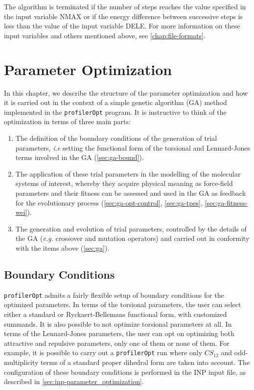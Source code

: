\documentclass[10pt,a4paper]{report}
\numberwithin{equation}{section}
\newcommand{\profileropt}[0]{\texttt{profilerOpt}}
\begin{document}
The algorithm is terminated if the number of steps reaches the value specified in the input variable NMAX or if the energy difference between successive steps is less than the value of the input variable DELE.
For more information on these input variables and others mentioned above, see \autoref{chap:file-formats}.

\chapter{Parameter Optimization}
\label{chap:ga}

In this chapter, we describe the structure of the parameter
optimization and how it is carried out in the context of a simple
genetic algorithm (GA) method implemented in the \profileropt{}
program. It is instructive to think of the optimization in terms of
three main parts:
\begin{enumerate}
\item The definition of the boundary conditions of the generation of
  trial parameters, \textit{i.e} setting the functional form of the
  torsional and Lennard-Jones terms involved in the GA
  (\autoref{sec:ga-bound}).

\item The application of these trial parameters in the modelling of
  the molecular systems of interest, whereby they acquire physical
  meaning as force-field parameters and their fitness can be assessed
  and used in the GA as feedback for the evolutionary process
  (\autoref{sec:ga-opt-control}, \autoref{sec:ga-tpes},
  \autoref{sec:ga-fitness-wei}).
  
\item The generation and evolution of trial parameters, controlled by
  the details of the GA (\textit{e.g.} crossover and mutation operators)
  and carried out in conformity with the items above
  (\autoref{sec:ga}).
\end{enumerate}

\section{Boundary Conditions}
\label{sec:ga-bound}

\profileropt{} admits a fairly flexible setup of boundary conditions
for the optimized parameters. In terms of the torsional parameters,
the user can select either a standard or Ryckaert-Bellemans functional
form, with customized summands. It is also possible to not optimize
torsional parameters at all. In terms of the Lennard-Jones parameters,
the user can opt on optimizing both attractive and repulsive
parameters, only one of them or none of them. For example, it is
possible to carry out a \profileropt{} run where only $CS_{12}$ and
odd-multiplicity terms of a standard proper dihedral form are taken
into account. The configuration of these boundary conditions is
performed in the INP input file, as described in
\autoref{sec:inp-parameter_optimization}.
\end{document}
